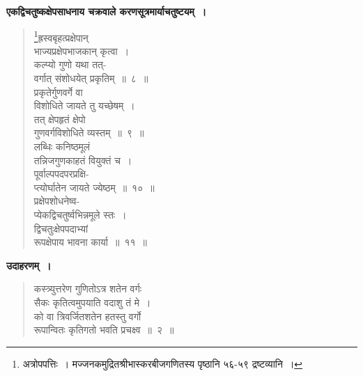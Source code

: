 \documentclass[11pt, openany]{book}
\begin{document}
\textbf{एकद्विचतुष्कक्षेपसाधनाय चक्रवाले करणसूत्रमार्याचतुष्टयम्~।}

 \label{10.8}
\begin{quote}
{\gk \renewcommand{\thefootnote}{१}\footnote{अत्रोपपत्तिः~। मज्जनकमुद्रितश्रीभास्करबीजगणितस्य पृष्ठानि ५६-५९ द्रष्टव्यानि~।}ह्रस्वबृहत्प्रक्षेपान्\\
भाज्यप्रक्षेपभाजकान् कृत्वा~।\\
कल्प्यो गुणो यथा तत्-\\
वर्गात् संशोधयेत् प्रकृतिम्~॥~८~॥\\
प्रकृतेर्गुणवर्गे वा\\
विशोधिते जायते तु यच्छेषम्~।\\
तत् क्षेपहृतं क्षेपो\\
गुणवर्गविशोधिते व्यस्तम्~॥~९~॥\\
लब्धिः कनिष्ठमूलं\\
तन्निजगुणकाहतं वियुक्तं च~।\\
पूर्वाल्पपदपरप्रक्षि-\\
प्त्योर्घातेन जायते ज्येष्ठम्~॥~१०~॥\\
प्रक्षेपशोधनेष्व-\\
प्येकद्विचतुर्ष्वभिन्नमूले स्तः~।\\
द्विचतुःक्षेपपदाभ्यां\\
रूपक्षेपाय भावना कार्या~॥~११~॥}
\end{quote}

\newpage

\textbf{उदाहरणम्~।}

\begin{quote}
{\ex कस्त्र्युत्तरेण गुणितोऽत्र शतेन वर्गः\\
सैकः कृतित्वमुपयाति वदाशु तं मे~।\\
को वा त्रिवर्जितशतेन हतस्तु वर्गो\\
रूपान्वितः कृतिगतो भवति प्रचक्ष्व~॥~२~॥	}
\end{quote} 
\end{document}
